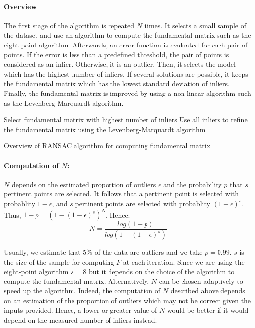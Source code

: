 \documentclass[12pt]{article}
\begin{document}
\paragraph{Overview}

The first stage of the algorithm is repeated $N$ times. It selects a small sample of the dataset and use an algorithm to compute the fundamental matrix such as the eight-point algorithm. Afterwards, an error function is evaluated for each pair of points. If the error is less than a predefined threshold, the pair of points is considered as an inlier. Otherwise, it is an outlier. Then, it selects the model which has the highest number of inliers. If several solutions are possible, it keeps the fundamental matrix which has the lowest standard deviation of inliers. Finally, the fundamental matrix is improved by using a non-linear algorithm such as the Levenberg-Marquardt algorithm.

\begin{algorithm}[H]
  Select fundamental matrix with highest number of inliers\;
  Use all inliers to refine the fundamental matrix using the Levenberg-Marquardt algorithm
 \caption{Overview of RANSAC algorithm for computing fundamental matrix}
\end{algorithm}

\paragraph{Computation of $N$:}

$N$ depends on the estimated proportion of outliers $\epsilon$ and the probability $p$ that $s$ pertinent points are selected. It follows that a pertinent point is selected with probablity $1 - \epsilon$, and $s$ pertinent points are selected with probablity $(1 - \epsilon)^s$. Thus, $1 - p = (1 - (1 - \epsilon)^s)^N$. Hence:
\[
    N = \frac{log(1 - p)}{log(1 - (1 - \epsilon)^s)}
\]

Usually, we estimate that 5\% of the data are outliers and we take $p=0.99$. $s$ is the size of the sample for computing $F$ at each iteration. Since we are using the eight-point algorithm $s=8$ but it depends on the choice of the algorithm to compute the fundamental matrix. Alternatively, $N$ can be chosen adaptively to speed up the algorithm. Indeed, the computation of $N$ described above depends on an estimation of the proportion of outliers which may not be correct given the inputs provided. Hence, a lower or greater value of $N$ would be better if it would depend on the measured number of inliers instead.
\end{document}

